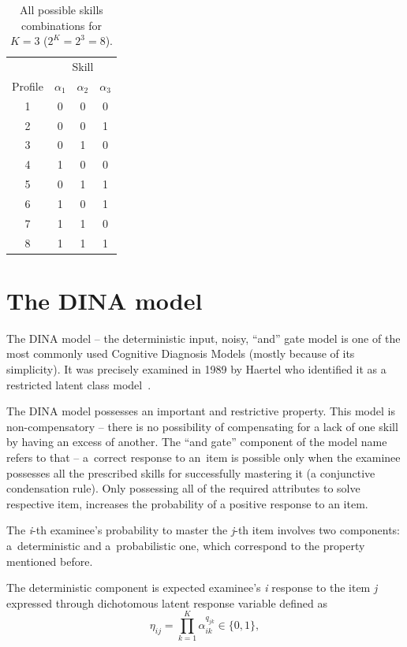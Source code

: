 \documentclass[english]{pwr_wmat_praca_dyplomowa}
\theoremstyle{plain}
\numberwithin{theorem}{chapter}
\theoremstyle{definition}
\numberwithin{theorem}{chapter}
\begin{document}
	\begin{table}[H]
		\centering
		\begin{tabular}{c c c c} 
			\hline
			{\rule{0pt}{3ex}} & \multicolumn{3}{c}{Skill} \\
			Profile & $\alpha_1$ & $\alpha_2$ & $\alpha_3$ \\ [0.5ex] 
			\hline
			1 & 0 & 0 & 0 \\ 
			2 & 0 & 0 & 1 \\
			3 & 0 & 1 & 0 \\
			4 & 1 & 0 & 0 \\
			5 & 0 & 1 & 1 \\
			6 & 1 & 0 & 1 \\ 
			7 & 1 & 1 & 0 \\
			8 & 1 & 1 & 1\\[1ex] 
			\hline
		\end{tabular}
		\caption{All possible skills combinations for $K=3$ ($2^K = 2^3 = 8$).}
		\label{tab:skillprofile} 
	\end{table}
	
	\section{The DINA model}
	
	The DINA model -- the deterministic input, noisy, ``and'' gate model is one of the most commonly used Cognitive Diagnosis Models (mostly because of its simplicity). It was precisely examined in 1989 by Haertel who identified it as a restricted latent class model~\cite{dina_model}. 
	
	The DINA model possesses an important and restrictive property. This model is non-compensatory -- there is no possibility of compensating for a lack of one skill by having an excess of another. The ``and gate'' component of the model name refers to that -- a~correct response to an~item is possible only when the examinee possesses all the prescribed skills for successfully mastering it (a conjunctive condensation rule). Only possessing all of the required attributes to solve respective item, increases the probability of a positive response to an item. 
	
	The \textit{i}-th examinee's probability to master the \textit{j}-th item involves two components: a~deterministic and a~probabilistic one, which correspond to the property mentioned before. 
	
	The deterministic component is expected examinee's \textit{i} response to the item \textit{j} expressed through dichotomous latent response variable defined as
	\begin{equation}
	\eta_{ij} = \prod\limits_{k=1}^{K} \alpha_{ik}^{q_{jk}} \in \{0,1\},
	\end{equation}
	
\end{document}
